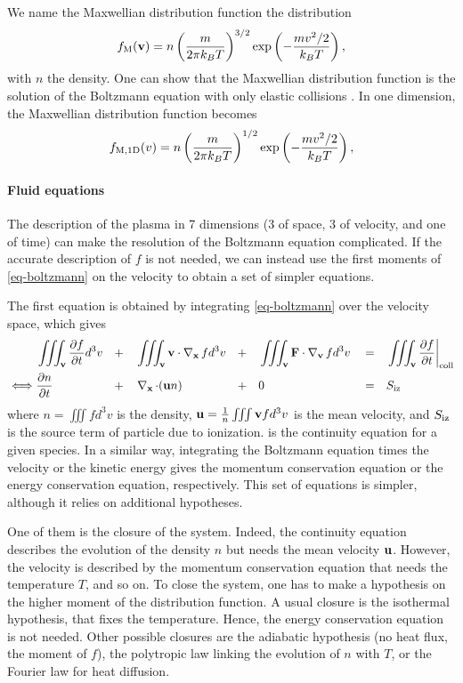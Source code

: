 We name the Maxwellian distribution function the distribution
\begin{equation} \label{eq-Maxwelliantwo}
  f_{\rm M}({\mathbf v}) = n \left( \frac{m}{2 \pi k_B T}\right)^{3/2} \exp \left( - \frac{ m v^2/2}{k_B T } \right),
\end{equation}
with $n$ the density.
One can show that the Maxwellian distribution function is the solution of the Boltzmann equation with only elastic collisions \citep{lieberman2005}.
In one dimension, the Maxwellian distribution function becomes
\begin{equation}
  f_{\rm M, 1D}(v) =  n \left(\frac{m}{2 \pi k_B T}\right)^{1/2} \exp \left( - \frac{ m v^2/2}{k_B T } \right),
\end{equation}

\paragraph{Fluid equations \\}
The description of the plasma in 7 dimensions (3 of space, 3 of velocity, and one of time) can make the resolution of the Boltzmann equation complicated.
If the accurate description of $f$ is not needed, we can instead use the first moments of \cref{eq-boltzmann} on the velocity to obtain a set of simpler equations.

The first equation is obtained by integrating \cref{eq-boltzmann} over the velocity space, which gives
\begin{align}
    & \iiint_{{\mathbf v}}  \frac{\partial f}{\partial t} d^3v &&+&& \iiint_{{\mathbf v}}  {\mathbf v} \cdot \operatorname{{\mathbf \nabla}}_{{\mathbf x}} f  d^3v &&+&&  \iiint_{{\mathbf v}}  {\mathbf F} \cdot  \operatorname{{\mathbf \nabla}}_{{\mathbf v}} f  d^3v && = && \iiint_{{\mathbf v}}  \frac{\partial f}{\partial t}  \bigg\vert_{\rm coll}  \nonumber  \\ 
   \iff &  \frac{\partial n}{\partial t} &&+&&  \operatorname{{\mathbf \nabla}}_{{\mathbf x}}  \cdot  ( {\mathbf u} n) &&+&& 0 &&=&& S_{\rm iz}   \label{eq-conc}
\end{align} 
where $n=\iiint f d^3v$ is the density, ${\mathbf u} = \frac{1}{n} \iiint {\mathbf v} f d^3v$ is the mean velocity, and $S_{\rm iz}$ is the source term of particle due to ionization.
 is the continuity equation for a given species.
In a similar way, integrating the Boltzmann equation times the velocity or the kinetic energy gives the momentum conservation equation or the energy conservation equation, respectively.
This set of equations is simpler, although it relies on additional hypotheses.

One of them is the closure of the system.
Indeed, the continuity equation describes the evolution of the density $n$ but needs the mean velocity ${\mathbf u}$.
However, the velocity is described by the momentum conservation equation that needs the temperature $T$, and so on.
To close the system, one has to make a hypothesis on the higher moment of the distribution function.
A usual closure is the isothermal hypothesis, that fixes the temperature. 
Hence, the energy conservation equation is not needed.
Other possible closures are the adiabatic hypothesis (no heat flux, the  moment of $f$), the polytropic law linking the evolution of $n$ with $T$, or the Fourier law for heat diffusion.


